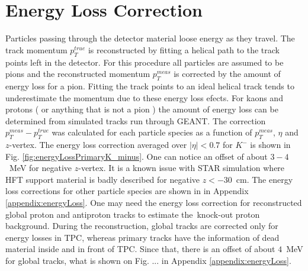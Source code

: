 

\chapter{Energy Loss Correction}\label{chap:energyLossCorrection}
Particles passing through the detector material loose energy as they travel. The track momentum $p_T^{true}$ is reconstructed by fitting a helical path to the track points left in the detector. For this procedure all particles are assumed to be pions and the reconstructed momentum $p_T^{meas}$ is corrected by the amount of energy loss for a pion. Fitting the track points to an ideal
helical track tends to underestimate the momentum due to these energy loss efects. For kaons and protons ( or anything that is not a pion ) the amount of energy loss can be determined from simulated tracks run through GEANT.
The correction $p_T^{meas}-p_T^{true}$ was calculated for each particle species as a function of $p_T^{meas}$, $\eta$ and $z$-vertex. The energy loss correction averaged over $|\eta|<0.7$ for $K^-$ is shown in Fig. \ref{fig:energyLossPrimaryK_minus}. One can notice an offset of about $3-4$~MeV for negative $z$-vertex. It is a known issue with STAR simulation where HFT support material is badly described for negative $z<-30$~cm.
\noindent The energy loss corrections for other particle species are shown in  in Appendix \ref{appendix:energyLoss}.\newline
\noindent One may need the energy loss correction for reconstructed global proton and antiproton tracks to estimate the~knock-out proton background. During the reconstruction, global tracks are corrected only for energy losses in TPC, whereas primary tracks have the information of dead material inside and in front of TPC. Since that, there is an offset of about $4$~MeV for global tracks, what is shown on Fig. ... in Appendix \ref{appendix:energyLoss}.


